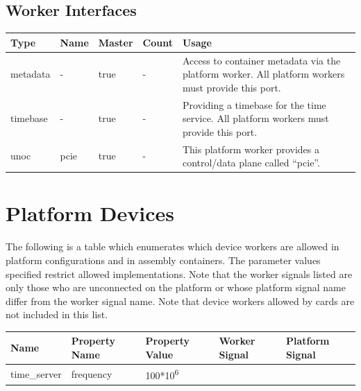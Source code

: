 \documentclass{article}
\begin{document}
\begin{landscape}
	\section*{Worker Interfaces}
	\begin{scriptsize}
		\begin{tabular}{|M{2cm}|M{2cm}|M{1.5cm}|M{1.5cm}|M{14.5cm}|}
			\hline
			Type       & Name & Master & Count & Usage                  \\
			\hline
			metadata   & -    & true   & -     & Access to container metadata via the platform worker. All platform workers must provide this port. \\
			\hline
			timebase   & -    & true   & -     & Providing a timebase for the time service. All platform workers must provide this port. \\
			\hline
			unoc       & pcie & true   & -     & This platform worker provides a control/data plane called ``pcie''. \\
			\hline
		\end{tabular}
	\end{scriptsize}

\end{landscape}
\pagebreak
	\section*{Platform Devices}
	The following is a table which enumerates which device workers are allowed in platform configurations and in assembly containers. The parameter values specified restrict allowed implementations. Note that the worker signals listed are only those who are unconnected on the platform or whose platform signal name differ from the worker signal name. Note that device workers allowed by cards are not included in this list.\\
			\begin{tabular}{|M{3cm}|M{3.5cm}|M{3cm}|M{3cm}|M{3cm}|}
			\hline
			Name                       & Property Name    & Property Value              & Worker Signal & Platform Signal         \\
			\hline
			time\_server               & frequency        & 100*10\textsuperscript{6}   &               &                         \\
			\hline
		\end{tabular}
\end{document}
